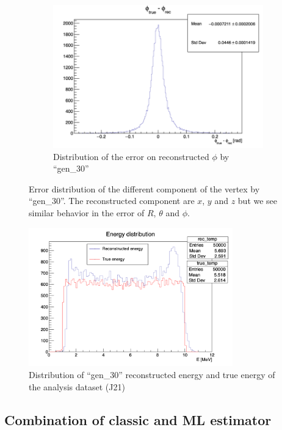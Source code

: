 \begin{figure}[ht]
\begin{subfigure}[t]{0.32\linewidth}
    \includegraphics[width=\linewidth]{images/jcnn/vic_cnn/cnn_delta_phi.png}
    \caption{Distribution of the error on reconstructed $\phi$ by ``gen\_30''}
    \label{fig:jcnn:vic_cnn:cnn_delta_phi}
  \end{subfigure}
  \caption{Error distribution of the different component of the vertex by ``gen\_30''. The reconstructed component are $x$, $y$ and $z$ but we see similar behavior in the error of $R$, $\theta$ and $\phi$.}
  \label{fig:jcnn:vic_cnn:cnn_perf}
\end{figure}

\begin{figure}[ht]
  \centering
  \includegraphics[height=6cm]{images/jcnn/vic_cnn/e_dis.png}
  \caption{Distribution of ``gen\_30'' reconstructed energy and true energy of the analysis dataset (J21)}
  \label{fig:jcnn:edis}
\end{figure}


\subsection{Combination of classic and ML estimator}
\label{sec:jcnn:combination}

